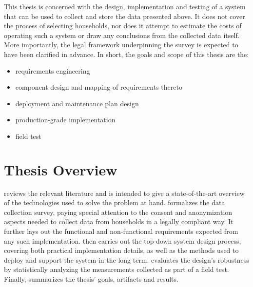 This thesis is concerned with the design, implementation and testing of a system that can be used to collect and store the data presented above. It does not cover the process of selecting households, nor does it attempt to estimate the costs of operating such a system or draw any conclusions from the collected data itself. More importantly, the legal framework underpinning the survey is expected to have been clarified in advance. In short, the goals and scope of this thesis are the:

\begin{itemize}
  \item requirements engineering
  \item component design and mapping of requirements thereto
  \item deployment and maintenance plan design
  \item production-grade implementation
  \item field test
\end{itemize}

\section{Thesis Overview}
\label{sec:thesis-overview}

 reviews the relevant literature and is intended to give a state-of-the-art overview of the technologies used to solve the problem at hand.  formalizes the data collection survey, paying special attention to the consent and anonymization aspects needed to collect data from households in a legally compliant way. It further lays out the functional and non-functional requirements expected from any such implementation.  then carries out the top-down system design process, covering both practical implementation details, as well as the methods used to deploy and support the system in the long term.  evaluates the design's robustness by statistically analyzing the measurements collected as part of a field test. Finally,  summarizes the thesis' goals, artifacts and results.

